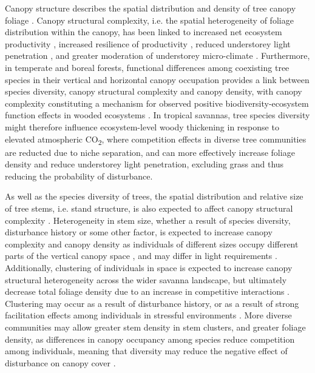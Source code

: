 \documentclass[11pt,a4paper]{article}
\begin{document}
Canopy structure describes the spatial distribution and density of tree canopy foliage \citep{Lowman2004}. Canopy structural complexity, i.e. the spatial heterogeneity of foliage distribution within the canopy, has been linked to increased net ecosystem productivity \citep{Hardiman2011,Chen2012,Law2001,Baldocchi2001,Morin2015}, increased resilience of productivity \citep{Pretzsch2014}, reduced understorey light penetration \citep{Scheuermann2018, Fotis2018}, and greater moderation of understorey micro-climate \citep{Wright2017}. Furthermore, in temperate and boreal forests, functional differences among coexisting tree species in their vertical and horizontal canopy occupation provides a link between species diversity, canopy structural complexity and canopy density, with canopy complexity constituting a mechanism for observed positive biodiversity-ecosystem function effects in wooded ecosystems \citep{Pretzsch2014, Barry2019}. In tropical savannas, tree species diversity might therefore influence ecosystem-level woody thickening in response to elevated atmospheric CO\textsubscript{2}, where competition effects in diverse tree communities are reducted due to niche separation, and can more effectively increase foliage density and reduce understorey light penetration, excluding grass and thus reducing the probability of disturbance. 

As well as the species diversity of trees, the spatial distribution and relative size of tree stems, i.e. stand structure, is also expected to affect canopy structural complexity \citep{Stark2015}. Heterogeneity in stem size, whether a result of species diversity, disturbance history or some other factor, is expected to increase canopy complexity and canopy density as individuals of different sizes occupy different parts of the vertical canopy space \citep{Panzou2020}, and may differ in light requirements \citep{CharlesDominique2018}. Additionally, clustering of individuals in space is expected to increase canopy structural heterogeneity across the wider savanna landscape, but ultimately decrease total foliage density due to an increase in competitive interactions \citep{Dohn2017}. Clustering may occur as a result of disturbance history, or as a result of strong facilitation effects among individuals in stressful environments \citep{Ratcliffe2017}. More diverse communities may allow greater stem density in stem clusters, and greater foliage density, as differences in canopy occupancy among species reduce competition among individuals, meaning that diversity may reduce the negative effect of disturbance on canopy cover \citep{Gough2019}.
\end{document}
